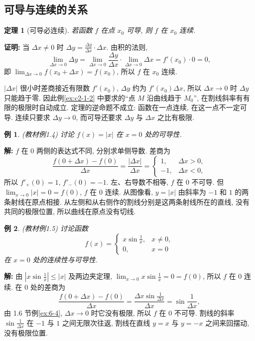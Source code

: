 \documentclass[UTF8,openany]{ctexbook}
\theoremstyle{chinesetextbook}
\newtheorem{example}{例}[section]
\newenvironment{cnproof}{\par\indent\textbf{证明:} \ignorespaces}{\par}
\newenvironment{cnsolution}{\par\indent\textbf{解:} \ignorespaces}{\par}
\newtheorem*{theoremsingle}{定理}
\begin{document}
\subsection{可导与连续的关系}
\begin{theoremsingle}[可导必连续]
若函数 $f$ 在点 $x_0$ 可导, 则 $f$ 在 $x_0$ 连续.
\end{theoremsingle}
\begin{cnproof}
当 $\Delta x\ne0$ 时 $\displaystyle\Delta y=\frac{\Delta y}{\Delta x}\cdot\Delta x$. 由积的法则,
\[
\lim_{\Delta x\to0}\Delta y=\lim_{\Delta x\to0}\frac{\Delta y}{\Delta x}\cdot\lim_{\Delta x\to0}\Delta x=f'(x_0)\cdot0=0,
\]
即 $\displaystyle\lim_{\Delta x\to0}f(x_0+\Delta x)=f(x_0)$, 所以 $f$ 在 $x_0$ 连续.
\end{cnproof}
$|\Delta x|$ 很小时差商接近有限数 $f'(x_0)$, $\Delta y$ 约为 $f'(x_0)\Delta x$, 所以 $\Delta x\to0$ 时 $\Delta y$ 只能趋于零. 因此例\ref{ex:c2-1-2} 中要求的“点 $M$ 沿曲线趋于 $M_0$”, 在割线斜率有有限的极限时自动成立. 定理的逆命题不成立: 函数在一点连续, 在这一点不一定可导. 连续只要求 $\Delta y\to0$, 而可导还要求 $\Delta y$ 与 $\Delta x$ 之比有极限.
\begin{example}\label{ex:c2-1-4}
\textnormal{(教材例1.4)} 讨论 $f(x)=|x|$ 在 $x=0$ 处的可导性.
\end{example}
\begin{cnsolution}
$f$ 在 $0$ 两侧的表达式不同, 分别求单侧导数. 差商为
\[
\frac{f(0+\Delta x)-f(0)}{\Delta x}=\frac{|\Delta x|}{\Delta x}=\begin{cases}1,&\Delta x>0,\\-1,&\Delta x<0,\end{cases}
\]
所以 $f'_+(0)=1$, $f'_-(0)=-1$. 左、右导数不相等, $f$ 在 $0$ 不可导. 但 $\displaystyle\lim_{x\to0}|x|=0=f(0)$, $f$ 在 $0$ 连续. 从图像看, $y=|x|$ 由斜率为 $-1$ 和 $1$ 的两条射线在原点相接. 从左侧和从右侧作的割线分别是这两条射线所在的直线, 没有共同的极限位置, 所以曲线在原点没有切线.
\end{cnsolution}
\begin{example}\label{ex:c2-1-5}
\textnormal{(教材例1.5)} 讨论函数
\[
f(x)=\begin{cases}x\sin\frac1x,&x\ne0,\\0,&x=0\end{cases}
\]
在 $x=0$ 处的连续性与可导性.
\end{example}
\begin{cnsolution}
由 $\displaystyle\left|x\sin\frac1x\right|\le|x|$ 及两边夹定理, $\displaystyle\lim_{x\to0}x\sin\frac1x=0=f(0)$, 所以 $f$ 在 $0$ 连续. 在 $0$ 处的差商为
\[
\frac{f(0+\Delta x)-f(0)}{\Delta x}=\frac{\Delta x\sin\frac1{\Delta x}}{\Delta x}=\sin\frac1{\Delta x},
\]
由 1.6 节例\ref{ex:6-4}, $\Delta x\to0$ 时它没有极限, 所以 $f$ 在 $0$ 不可导. 割线的斜率 $\displaystyle\sin\frac1{\Delta x}$ 在 $-1$ 与 $1$ 之间无限次往返, 割线在直线 $y=x$ 与 $y=-x$ 之间来回摆动, 没有极限位置.
\end{cnsolution}
\end{document}
